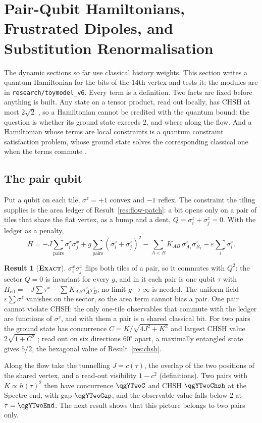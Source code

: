 \documentclass[11pt]{article}
\newcommand{\exact}{\textbf{\textsc{Exact}}}
\theoremstyle{definition}
\newtheorem{result}{Result}
\begin{document}
\section{Pair-Qubit Hamiltonians, Frustrated Dipoles, and Substitution Renormalisation}
\label{sec:ham}

The dynamic sections so far use classical history weights. This section writes a quantum Hamiltonian for the bits of the 14th vertex and tests it; the modules are in \texttt{research/toymodel\_v6}. Every term is a definition. Two facts are fixed before anything is built. Any state on a tensor product, read out locally, has CHSH at most $2\sqrt2$ \cite{cirelson1980}, so a Hamiltonian cannot be credited with the quantum bound: the question is whether its ground state exceeds $2$, and where along the flow. And a Hamiltonian whose terms are local constraints is a quantum constraint satisfaction problem, whose ground state solves the corresponding classical one when the terms commute \cite{gharibian2015}.

\subsection{The pair qubit}\label{sec:ham-pair}
Put a qubit on each tile, $\sigma^z=+1$ convex and $-1$ reflex. The constraint the tiling supplies is the area ledger of Result~\ref{res:flow-patch}: a bit opens only on a pair of tiles that share the flat vertex, as a bump and a dent, $Q=\sigma^z_i+\sigma^z_j=0$. With the ledger as a penalty,
\begin{equation}\label{eq:hbit}
H=-J\sum_{\mathrm{pairs}}\sigma^x_i\sigma^x_j+g\sum_{\mathrm{pairs}}(\sigma^z_i+\sigma^z_j)^2-\sum_{A<B}K_{AB}\,\sigma^z_{A_1}\sigma^z_{B_1}-\varepsilon\sum_i\sigma^z_i .
\end{equation}
\begin{result}[\exact]\label{res:ham-pair}
$\sigma^x_i\sigma^x_j$ flips both tiles of a pair, so it commutes with $Q^2$: the sector $Q=0$ is invariant for every $g$, and in it each pair is one qubit $\tau$ with $H_{\mathrm{eff}}=-J\sum\tau^x-\sum K_{AB}\tau^z_A\tau^z_B$; no limit $g\to\infty$ is needed. The uniform field $\varepsilon\sum\sigma^z$ vanishes on the sector, so the area term cannot bias a pair. One pair cannot violate CHSH: the only one-tile observables that commute with the ledger are functions of $\sigma^z$, and with them a pair is a shared classical bit. For two pairs the ground state has concurrence $C=K/\sqrt{4J^2+K^2}$ \cite{wootters1998} and largest CHSH value $2\sqrt{1+C^2}$ \cite{horodecki1995}; read out on six directions $60^\circ$ apart, a maximally entangled state gives $5/2$, the hexagonal value of Result~\ref{res:chsh}.
\end{result}
Along the flow take the tunnelling $J=c(\tau)$, the overlap of the two positions of the shared vertex, and a read-out visibility $1-c^2$ (definitions). Two pairs with $K\propto h(\tau)^2$ then have concurrence $\qgYTwoC$ and CHSH $\qgYTwoChsh$ at the Spectre end, with gap $\qgYTwoGap$, and the observable value falls below $2$ at $\tau=\qgYTwoEnd$. The next result shows that this picture belongs to two pairs only.
\end{document}
